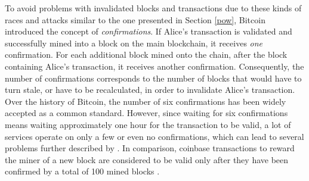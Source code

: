 \documentclass[a4paper,12pt,twoside]{report}
\begin{document}
To avoid problems with invalidated blocks and transactions due to these kinds of races and attacks similar to the one presented in Section \ref{pow}, Bitcoin introduced the concept of \textit{confirmations}. If Alice's transaction is validated and successfully mined into a block on the main blockchain, it receives \textit{one} confirmation. For each additional block mined onto the chain, after the block containing Alice's transaction, it receives another confirmation. Consequently, the number of confirmations corresponds to the number of blocks that would have to turn stale, or have to be recalculated, in order to invalidate Alice's transaction. Over the history of Bitcoin, the number of six confirmations has been widely accepted as a common standard. However, since waiting for six confirmations means waiting approximately one hour for the transaction to be valid, a lot of services operate on only a few or even no confirmations, which can lead to several problems further described by \cite{premining1}. In comparison, coinbase transactions to reward the miner of a new block are considered to be valid only after they have been confirmed by a total of 100 mined blocks \cite{antonopoulos2017mastering}.
\end{document}

